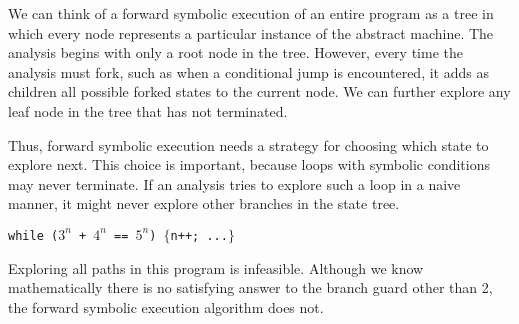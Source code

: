 We can think of a forward symbolic execution of an entire program as a tree in which every node represents a particular instance of the abstract machine. The analysis begins with only a root node in the tree. However, every time the analysis must fork, such as when a conditional jump is encountered, it adds as children all possible forked states to the current node. We can further explore any leaf node in the tree that has not terminated. 

Thus, forward symbolic execution needs a strategy for choosing which state to explore next. This choice is important, because loops with symbolic conditions may never terminate. If an analysis tries to explore such a loop in a naive manner, it might never explore other branches in the state tree.

\begin{center}\texttt{while ($3^{n}$ + $4^{n}$ == $5^{n}$) $\{$n++; ...$\}$}\end{center}


Exploring all paths in this program is infeasible. Although we know mathematically there is no satisfying answer to the branch guard other than 2, the forward symbolic execution algorithm does not.

